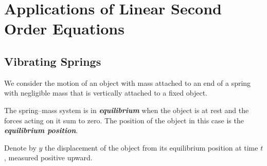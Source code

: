 \chapter{Applications of Linear Second Order Equations}

\section{Vibrating Springs}

We consider the motion of an object with mass attached to an end of a spring with negligible mass that is vertically attached to a fixed object.

The spring–mass system is in \emph{\textbf{equilibrium}} when the object is at rest and the forces acting on it sum to zero. The position of the object in this case is the \emph{\textbf{equilibrium position}}. 

Denote by $y$ the displacement of the object from its equilibrium position at time $t$, measured positive upward.

